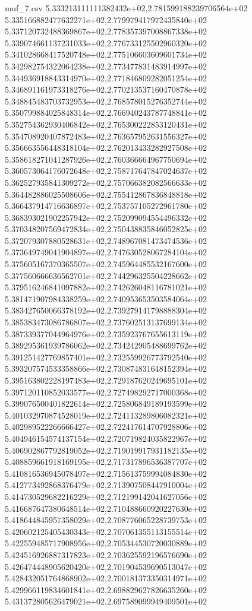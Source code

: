 \begin{filecontents*}{muf_7.csv}
5.333213111111382432e+02,2.781599188239706564e+02
5.335166882477632271e+02,2.779979417972435840e+02
5.337120732488369867e+02,2.778357397008867338e+02
5.339074661137231033e+02,2.776733125502960320e+02
5.341028668417520748e+02,2.775106603609601734e+02
5.342982754322064238e+02,2.773477831483914997e+02
5.344936918843314970e+02,2.771846809282051254e+02
5.346891161973318276e+02,2.770213537160470878e+02
5.348845483703732953e+02,2.768578015276352744e+02
5.350799884025848314e+02,2.766940243787748841e+02
5.352754362930406842e+02,2.765300222853120431e+02
5.354708920407872483e+02,2.763657952631556327e+02
5.356663556448318104e+02,2.762013433282927508e+02
5.358618271041287926e+02,2.760366664967750694e+02
5.360573064176072648e+02,2.758717647847024637e+02
5.362527935841309272e+02,2.757066382082566633e+02
5.364482886025508606e+02,2.755412867836848818e+02
5.366437914716636897e+02,2.753757105272961780e+02
5.368393021902257942e+02,2.752099094554496332e+02
5.370348207569472834e+02,2.750438835846052825e+02
5.372079307880528631e+02,2.748967081473474536e+02
5.373649749041904897e+02,2.747630528067284104e+02
5.375605167370365507e+02,2.745964485532167600e+02
5.377560666636562701e+02,2.744296325504228662e+02
5.379516246841097882e+02,2.742626048116781021e+02
5.381471907984338259e+02,2.740953653503584064e+02
5.383427650066378192e+02,2.739279141798888304e+02
5.385383473086786807e+02,2.737602513137699134e+02
5.387339377044964976e+02,2.735923767655613119e+02
5.389295361939786062e+02,2.734242905488699762e+02
5.391251427769857401e+02,2.732559926773792540e+02
5.393207574533358866e+02,2.730874831648152394e+02
5.395163802228197483e+02,2.729187620249695101e+02
5.397120110852033577e+02,2.727498292717000368e+02
5.399076500401822614e+02,2.725806849189193599e+02
5.401032970874528019e+02,2.724113289806082321e+02
5.402989522266666427e+02,2.722417614707928806e+02
5.404946154574137154e+02,2.720719824035822967e+02
5.406902867792819052e+02,2.719019917931182135e+02
5.408859661918169195e+02,2.717317896536387707e+02
5.410816536945078497e+02,2.715613759994084830e+02
5.412773492868376479e+02,2.713907508447910004e+02
5.414730529682216229e+02,2.712199142041627056e+02
5.416687647380648514e+02,2.710488660920227630e+02
5.418644845957358029e+02,2.708776065228739753e+02
5.420602125405430343e+02,2.707061355113155514e+02
5.422559485717908956e+02,2.705344530720030889e+02
5.424516926887317823e+02,2.703625592196576690e+02
5.426474448905620420e+02,2.701904539690513047e+02
5.428432051764868902e+02,2.700181373350314971e+02
5.429966119834601841e+02,2.698829627826635260e+02
5.431372805626479021e+02,2.697589099949409501e+02

\end{filecontents*}
